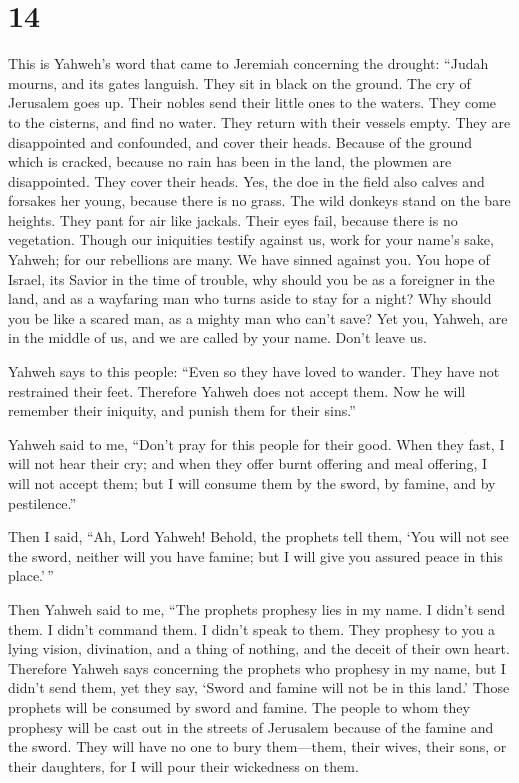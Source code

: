 \hypertarget{section-13}{%
\section{14}\label{section-13}}

 This is Yahweh's word that came to Jeremiah concerning the
drought:  ``Judah mourns, and its gates languish. They sit
in black on the ground. The cry of Jerusalem goes up.  Their
nobles send their little ones to the waters. They come to the cisterns,
and find no water. They return with their vessels empty. They are
disappointed and confounded, and cover their heads.  Because
of the ground which is cracked, because no rain has been in the land,
the plowmen are disappointed. They cover their heads.  Yes,
the doe in the field also calves and forsakes her young, because there
is no grass.  The wild donkeys stand on the bare heights.
They pant for air like jackals. Their eyes fail, because there is no
vegetation.  Though our iniquities testify against us, work
for your name's sake, Yahweh; for our rebellions are many. We have
sinned against you.  You hope of Israel, its Savior in the
time of trouble, why should you be as a foreigner in the land, and as a
wayfaring man who turns aside to stay for a night?  Why
should you be like a scared man, as a mighty man who can't save? Yet
you, Yahweh, are in the middle of us, and we are called by your name.
Don't leave us.

 Yahweh says to this people: ``Even so they have loved to
wander. They have not restrained their feet. Therefore Yahweh does not
accept them. Now he will remember their iniquity, and punish them for
their sins.''

 Yahweh said to me, ``Don't pray for this people for their
good.  When they fast, I will not hear their cry; and when
they offer burnt offering and meal offering, I will not accept them; but
I will consume them by the sword, by famine, and by pestilence.''

 Then I said, ``Ah, Lord Yahweh! Behold, the prophets tell
them, `You will not see the sword, neither will you have famine; but I
will give you assured peace in this place.'\,''

 Then Yahweh said to me, ``The prophets prophesy lies in my
name. I didn't send them. I didn't command them. I didn't speak to them.
They prophesy to you a lying vision, divination, and a thing of nothing,
and the deceit of their own heart.  Therefore Yahweh says
concerning the prophets who prophesy in my name, but I didn't send them,
yet they say, `Sword and famine will not be in this land.' Those
prophets will be consumed by sword and famine.  The people
to whom they prophesy will be cast out in the streets of Jerusalem
because of the famine and the sword. They will have no one to bury
them---them, their wives, their sons, or their daughters, for I will
pour their wickedness on them.

